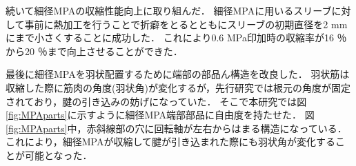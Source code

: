 \documentclass{jarticle}
\begin{document}
続いて細径MPAの収縮性能向上に取り組んだ．
細径MPAに用いるスリーブに対して事前に熱加工を行うことで折癖をとるとともにスリーブの初期直径を2 mmにまで小さくすることに成功した．
これにより0.6 MPa印加時の収縮率が16 ％から20 ％まで向上させることができた．

最後に細径MPAを羽状配置するために端部の部品ん構造を改良した．
羽状筋は収縮した際に筋肉の角度(羽状角)が変化するが，先行研究\cite{crabrobot2}では根元の角度が固定されており，腱の引き込みの妨げになっていた．
そこで本研究では図\ref{fig:MPAparts}に示すように細径MPA端部部品に自由度を持たせた．
図\ref{fig:MPAparts}中，赤斜線部の穴に回転軸が左右からはまる構造になっている．
これにより，細径MPAが収縮して腱が引き込まれた際にも羽状角が変化することが可能となった．
\end{document}
